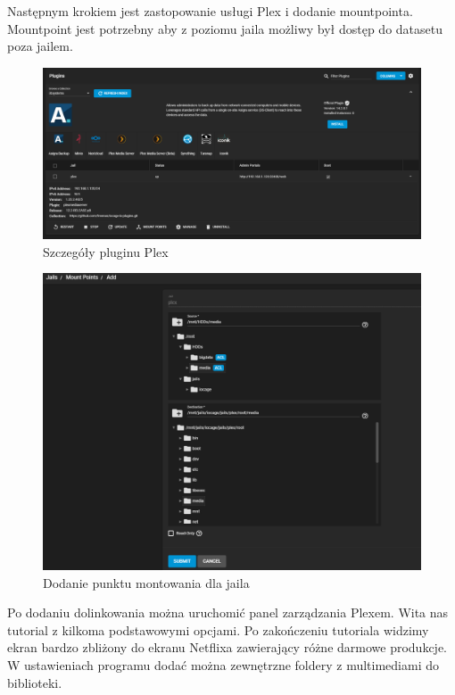 \documentclass[12pt,a4paper]{article}
\newcommand{\<}{\langle}
\renewcommand{\>}{\rangle}
\theoremstyle{definition}
\begin{document}
Następnym krokiem jest zastopowanie usługi Plex i dodanie mountpointa. Mountpoint jest potrzebny aby z poziomu jaila możliwy był dostęp do datasetu poza jailem.

\begin{figure}[H]
    \centering
    \includegraphics[width=\linewidth]{img/ss_plex/16.png}
    \caption{Szczegóły pluginu Plex}
\end{figure}

\begin{figure}[H]
    \centering
    \includegraphics[width=\linewidth]{img/ss_plex/17.png}
    \caption{Dodanie punktu montowania dla jaila}
\end{figure}

Po dodaniu dolinkowania można uruchomić panel zarządzania Plexem. Wita nas tutorial z kilkoma podstawowymi opcjami. Po zakończeniu tutoriala widzimy ekran bardzo zbliżony do ekranu Netflixa zawierający różne darmowe produkcje. W ustawieniach programu dodać można zewnętrzne foldery z multimediami do biblioteki.
\end{document}

